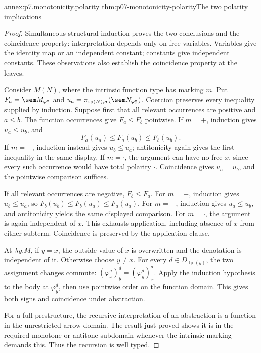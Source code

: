 \begin{annexitem}{annex:p7.monotonicity.polarity}
 {thm:p07-monotonicity-polarity}{The two polarity implications}
\begin{proof}
Simultaneous structural induction proves the two conclusions and the
coincidence property: interpretation depends only on free variables.
Variables give the identity map or an independent constant; constants
give independent constants. These observations also establish the
coincidence property at the leaves.

Consider \(M(N)\), where the intrinsic function type has marking \(m\).
Put \(F_a=\sem M_{\varphi_x^a}\) and
\(u_a=\pi_{\operatorname{tp}(N),\sigma}
                  (\sem N_{\varphi_x^a})\).
Coercion preserves every inequality supplied by induction.
Suppose first that all relevant occurrences are positive and \(a\leq b\).
The function occurrences give \(F_a\leq F_b\) pointwise.
If \(m=+\), induction gives \(u_a\leq u_b\), and
\[
 F_a(u_a)\leq F_a(u_b)\leq F_b(u_b).
\]
If \(m=-\), induction instead gives \(u_b\leq u_a\); antitonicity again
gives the first inequality in the same display.
If \(m=\cdot\), the argument can have no free \(x\), since every such
occurrence would have total polarity \(\cdot\). Coincidence gives
\(u_a=u_b\), and the pointwise comparison suffices.

If all relevant occurrences are negative, \(F_b\leq F_a\).
For \(m=+\), induction gives \(u_b\leq u_a\), so
\(F_b(u_b)\leq F_b(u_a)\leq F_a(u_a)\).
For \(m=-\), induction gives \(u_a\leq u_b\), and antitonicity yields
the same displayed comparison. For \(m=\cdot\), the argument is again
independent of \(x\). This exhausts application, including absence of \(x\)
from either subterm. Coincidence is preserved by the application clause.

At \(\lambda y.M\), if \(y=x\), the outside value of \(x\) is overwritten
and the denotation is independent of it. Otherwise choose \(y\ne x\).
For every \(d\in D_{\operatorname{tp}(y)}\), the two assignment changes
commute:
\((\varphi_x^a)_y^d=(\varphi_y^d)_x^a\).
Apply the induction hypothesis to the body at \(\varphi_y^d\), then use
pointwise order on the function domain. This gives both signs and
coincidence under abstraction.

For a full prestructure, the recursive interpretation of an abstraction
is a function in the unrestricted arrow domain. The result just proved
shows it is in the required monotone or antitone subdomain whenever the
intrinsic marking demands this. Thus the recursion is well typed.
\end{proof}
\end{annexitem}


